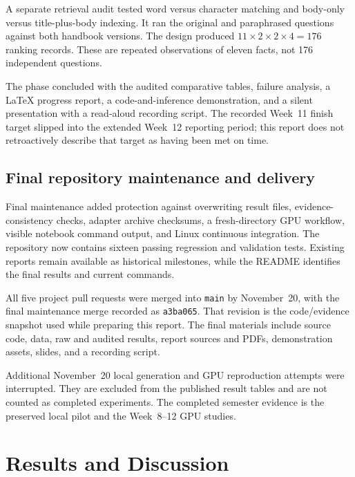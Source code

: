 \documentclass[11pt,letterpaper,oneside]{report}
\begin{document}
A separate retrieval audit tested word versus character matching and body-only versus title-plus-body indexing. It ran the original and paraphrased questions against both handbook versions. The design produced $11\times2\times2\times4=176$ ranking records. These are repeated observations of eleven facts, not 176 independent questions.

The phase concluded with the audited comparative tables, failure analysis, a LaTeX progress report, a code-and-inference demonstration, and a silent presentation with a read-aloud recording script. The recorded Week~11 finish target slipped into the extended Week~12 reporting period; this report does not retroactively describe that target as having been met on time.

\section{Final repository maintenance and delivery}
Final maintenance added protection against overwriting result files, evidence-consistency checks, adapter archive checksums, a fresh-directory GPU workflow, visible notebook command output, and Linux continuous integration. The repository now contains sixteen passing regression and validation tests. Existing reports remain available as historical milestones, while the README identifies the final results and current commands.

All five project pull requests were merged into \texttt{main} by November~20, with the final maintenance merge recorded as \texttt{a3ba065}. That revision is the code/evidence snapshot used while preparing this report. The final materials include source code, data, raw and audited results, report sources and PDFs, demonstration assets, slides, and a recording script.

Additional November~20 local generation and GPU reproduction attempts were interrupted. They are excluded from the published result tables and are not counted as completed experiments. The completed semester evidence is the preserved local pilot and the Week~8--12 GPU studies.

\chapter{Results and Discussion}
\end{document}

